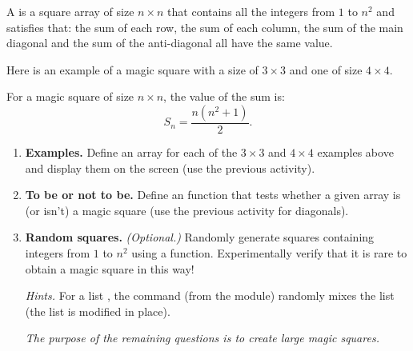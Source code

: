 \documentclass[11pt,class=report,crop=false]{standalone}
\begin{document}

\begin{activite}




A  is a square array of size $n\times n$ that contains all the integers from $1$ to $n^2$ and satisfies that:
the sum of each row, the sum of each column, the sum of the main diagonal and the sum of the anti-diagonal all have the same value.

Here is an example of a magic square with a size of $3\times 3$ and one of size  $4\times 4$.





For a magic square of size $n \times n$, the value of the sum is:
$$S_n = \frac{n(n^2+1)}{2}.$$



\begin{enumerate}
  \item \textbf{Examples.} Define an array for each of the $3 \times 3$ and $4 \times 4$ examples above and display them on the screen (use the previous activity).
  
  \item \textbf{To be or not to be.} Define an  function that tests whether a given array is (or isn't) a magic square (use the previous activity for diagonals).
  
  \item \textbf{Random squares.} \emph{(Optional.)} Randomly generate squares containing integers from $1$ to $n^2$ using a  function. Experimentally verify that it is rare to obtain a magic square in this way! 

  \emph{Hints.} For a list , the command  (from the  module) randomly mixes the list (the list is modified in place). 
 
 
 \medskip
	
  \emph{The purpose of the remaining questions is to create large magic squares.}
	 

\end{enumerate}
\end{activite}
\end{document}
